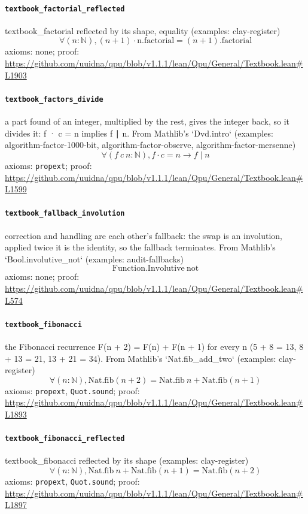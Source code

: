 \documentclass[11pt]{article}
\begin{document}
\paragraph{\texttt{textbook\_factorial\_reflected}}
textbook\_factorial reflected by its shape, equality (examples: clay-register)
\[ \forall (n : \mathbb{N}), (n + 1) \cdot \mathrm{n.factorial} = (n + 1)\mathrm{.factorial} \]
\noindent axioms: none; proof: \url{https://github.com/uuidna/qpu/blob/v1.1.1/lean/Qpu/General/Textbook.lean\#L1903}

\paragraph{\texttt{textbook\_factors\_divide}}
a part found of an integer, multiplied by the rest, gives the integer back, so it divides it: f · c = n implies f ∣ n. From Mathlib's `Dvd.intro` (examples: algorithm-factor-1000-bit, algorithm-factor-observe, algorithm-factor-mersenne)
\[ \forall (f\ c\ n : \mathbb{N}), f \cdot c = n \to f \mid n \]
\noindent axioms: \texttt{propext}; proof: \url{https://github.com/uuidna/qpu/blob/v1.1.1/lean/Qpu/General/Textbook.lean\#L1599}

\paragraph{\texttt{textbook\_fallback\_involution}}
correction and handling are each other's fallback: the swap is an involution, applied twice it is the identity, so the fallback terminates. From Mathlib's `Bool.involutive\_not` (examples: audit-fallbacks)
\[ \mathrm{Function.Involutive}\ \mathrm{not} \]
\noindent axioms: none; proof: \url{https://github.com/uuidna/qpu/blob/v1.1.1/lean/Qpu/General/Textbook.lean\#L574}

\paragraph{\texttt{textbook\_fibonacci}}
the Fibonacci recurrence F(n + 2) = F(n) + F(n + 1) for every n (5 + 8 = 13, 8 + 13 = 21, 13 + 21 = 34). From Mathlib's `Nat.fib\_add\_two` (examples: clay-register)
\[ \forall (n : \mathbb{N}), \mathrm{Nat.fib} (n + 2) = \mathrm{Nat.fib}\ n + \mathrm{Nat.fib} (n + 1) \]
\noindent axioms: \texttt{propext}, \texttt{Quot.sound}; proof: \url{https://github.com/uuidna/qpu/blob/v1.1.1/lean/Qpu/General/Textbook.lean\#L1893}

\paragraph{\texttt{textbook\_fibonacci\_reflected}}
textbook\_fibonacci reflected by its shape (examples: clay-register)
\[ \forall (n : \mathbb{N}), \mathrm{Nat.fib}\ n + \mathrm{Nat.fib} (n + 1) = \mathrm{Nat.fib} (n + 2) \]
\noindent axioms: \texttt{propext}, \texttt{Quot.sound}; proof: \url{https://github.com/uuidna/qpu/blob/v1.1.1/lean/Qpu/General/Textbook.lean\#L1897}
\end{document}
